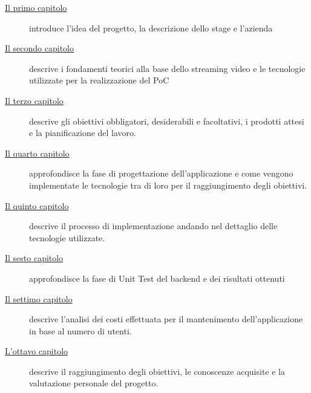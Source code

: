 \begin{description}

    \item[{\hyperref[cap:introduzione]{Il primo capitolo}}] introduce l'idea del progetto, la descrizione dello stage e l'azienda
    \item[{\hyperref[cap:fondamentiteorici]{Il secondo capitolo}}] descrive i fondamenti teorici alla base dello streaming video e le tecnologie utilizzate per la realizzazione del PoC
    
    \item[{\hyperref[cap:analisi-requisiti]{Il terzo capitolo}}] descrive gli obiettivi obbligatori, desiderabili e facoltativi, i prodotti attesi e la pianificazione del lavoro.
    
    \item[{\hyperref[cap:progettazione]{Il quarto capitolo}}] approfondisce la fase di progettazione dell'applicazione e come vengono implementate le tecnologie tra di loro per il raggiungimento degli obiettivi.
    
    \item[{\hyperref[cap:implementazione]{Il quinto capitolo}}] descrive il processo di implementazione andando nel dettaglio delle tecnologie utilizzate.
    
    \item[{\hyperref[cap:testing]{Il sesto capitolo}}] approfondisce la fase di Unit Test del backend e dei risultati ottenuti

    \item[{\hyperref[cap:analisi-costi]{Il settimo capitolo}}] descrive l'analisi dei costi effettuata per il mantenimento dell'applicazione in base al numero di utenti.

    
    \item[{\hyperref[cap:conclusioni]{L'ottavo capitolo}}] descrive il raggiungimento degli obiettivi, le conoscenze acquisite e la valutazione personale del progetto.
\end{description}

